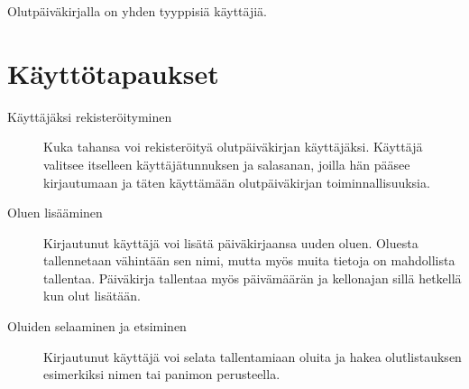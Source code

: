 \documentclass[12pt]{amsart}
\begin{document}
Olutpäiväkirjalla on yhden tyyppisiä käyttäjiä.

\section{Käyttötapaukset}

\begin{description}
\item[Käyttäjäksi rekisteröityminen] Kuka tahansa voi rekisteröityä olutpäiväkirjan käyttäjäksi. Käyttäjä valitsee itselleen käyttäjätunnuksen ja salasanan, joilla hän pääsee kirjautumaan ja täten käyttämään olutpäiväkirjan toiminnallisuuksia.

\item[Oluen lisääminen] Kirjautunut käyttäjä voi lisätä päiväkirjaansa uuden oluen. Oluesta tallennetaan vähintään sen nimi, mutta myös muita tietoja on mahdollista tallentaa. Päiväkirja tallentaa myös päivämäärän ja kellonajan sillä hetkellä kun olut lisätään.

\item[Oluiden selaaminen ja etsiminen] Kirjautunut käyttäjä voi selata tallentamiaan oluita ja hakea olutlistauksen esimerkiksi nimen tai panimon perusteella.
\end{description}
\end{document}
